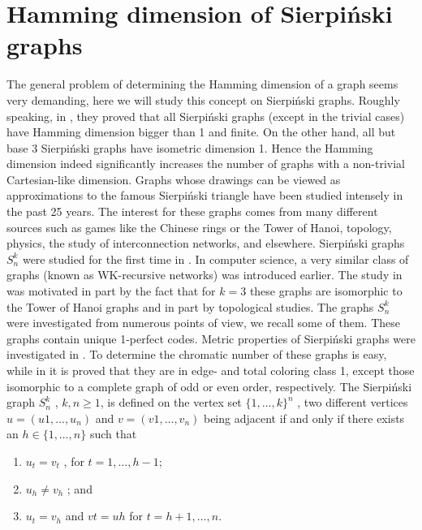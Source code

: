 \documentclass[12pt,a4paper,titlepage,openany]{report}
\begin{document}
\section{Hamming dimension of Sierpiński graphs}
The general problem of determining the Hamming dimension of a graph seems very demanding, here we will study this concept on Sierpiński graphs. Roughly speaking, in \cite{Sandi}, they proved that all Sierpi\'nski graphs (except in the trivial cases) have Hamming dimension bigger than 1 and finite. On the other hand, all but base 3 Sierpi\'nski graphs have isometric dimension 1. Hence the Hamming dimension indeed significantly increases the number of graphs with a non-trivial Cartesian-like dimension.\newline
Graphs whose drawings can be viewed as approximations to the famous Sierpi\'nski triangle have been studied intensely in the past 25 years. The interest for these graphs comes from many different sources such as games like the Chinese rings or the Tower of Hanoi, topology, physics, the study of interconnection networks, and elsewhere.\newline
Sierpi\'nski graphs $S^{k}_n$ were studied for the first time in \cite{Sandi2}. In computer science, a very similar class of graphs (known as WK-recursive networks) was introduced earlier. The study in \cite{Sandi2} was motivated in part by the fact that for $k=3$ these graphs are isomorphic to the Tower of Hanoi graphs and in part by topological studies.\newline
The graphs $S^k_n$ were investigated from numerous points of view, we recall some of them. These graphs contain unique 1-perfect codes. Metric properties of Sierpi\'nski graphs were investigated in \cite{Andreas}. To
determine the chromatic number of these graphs is easy, while in \cite{Andreas2} it is proved that they are in
edge- and total coloring class 1, except those isomorphic to a complete graph of odd or even order, respectively.\newline
The Sierpi\'nski graph $S^k_n$ , $k,n\geq 1$, is defined on the vertex set $\{ 1,\ldots,k \}^n$ , two different vertices $u = ( u 1 ,\ldots, u_n )$ and $v = (v 1 ,\ldots , v_n )$ being adjacent if and only if there exists an $h \in \{ 1 , \ldots, n \}$ such that
\begin{enumerate}[label=(\roman*)]
\item $u_t = v_t$ , for $t = 1 ,\ldots , h − 1$;
\item $u_h \neq v_h$ ; and
\item $u_t = v_h$ and $v t = u h$ for $t = h+ 1 ,\ldots, n$.
\end{enumerate}
\end{document}
